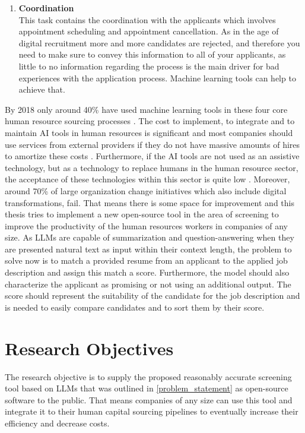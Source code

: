 \documentclass[draft,final]{thesisclass} %
\begin{document}
\begin{enumerate}
    \item \textbf{Coordination}\\
    This task contains the coordination with the applicants which involves appointment scheduling and appointment cancellation. As in the age of digital recruitment more and more candidates are rejected, and therefore you need to make sure to convey this information to all of your applicants, as little to no information regarding the process is the main driver for bad experiences with the application process. Machine learning tools can help to achieve that.
\end{enumerate}
By 2018 only around 40\% have used machine learning tools in these four core human resource sourcing processes \cite[4]{ai_recruiting}.
The cost to implement, to integrate and to maintain AI tools in human resources is significant and most companies should use services from external providers if they do not have massive amounts of hires to amortize these costs \cite[8]{ai_recruiting}.
Furthermore, if the AI tools are not used as an assistive technology, but as a technology to replace humans in the human resource sector, the acceptance of these technologies within this sector is quite low \cite[9]{ai_recruiting}.
Moreover, around 70\% of large organization change initiatives which also include digital transformations, fail.
That means there is some space for improvement and this thesis tries to implement a new open-source tool in the area of screening to improve the productivity of the human resources workers in companies of any size.
As \acs{LLM}s are capable of summarization and question-answering when they are presented natural text as input within their context length, the problem to solve now is to match a provided resume from an applicant to the applied job description and assign this match a score.
Furthermore, the model should also characterize the applicant as promising or not using an additional output.
The score should represent the suitability of the candidate for the job description and is needed to easily compare candidates and to sort them by their score.

\section{Research Objectives}
The research objective is to supply the proposed reasonably accurate screening tool based on \acs{LLM}s that was outlined in \ref{problem_statement} as open-source software to the public. 
That means companies of any size can use this tool and integrate it to their human capital sourcing pipelines to eventually increase their efficiency and decrease costs.
\end{document}
